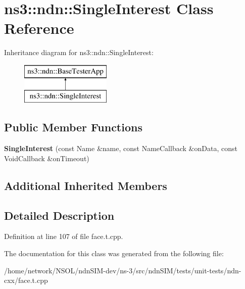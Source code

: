 \hypertarget{classns3_1_1ndn_1_1SingleInterest}{}\section{ns3\+:\+:ndn\+:\+:Single\+Interest Class Reference}
\label{classns3_1_1ndn_1_1SingleInterest}
Inheritance diagram for ns3\+:\+:ndn\+:\+:Single\+Interest\+:\begin{figure}[H]
\begin{center}
\leavevmode
\includegraphics[height=2.000000cm]{classns3_1_1ndn_1_1SingleInterest}
\end{center}
\end{figure}
\subsection*{Public Member Functions}
\begin{DoxyCompactItemize}
\item 
{\bfseries Single\+Interest} (const Name \&name, const Name\+Callback \&on\+Data, const Void\+Callback \&on\+Timeout)\hypertarget{classns3_1_1ndn_1_1SingleInterest_a289e612447e3979128070667e7056704}{}\label{classns3_1_1ndn_1_1SingleInterest_a289e612447e3979128070667e7056704}

\end{DoxyCompactItemize}
\subsection*{Additional Inherited Members}


\subsection{Detailed Description}


Definition at line 107 of file face.\+t.\+cpp.



The documentation for this class was generated from the following file\+:\begin{DoxyCompactItemize}
\item 
/home/network/\+N\+S\+O\+L/ndn\+S\+I\+M-\/dev/ns-\/3/src/ndn\+S\+I\+M/tests/unit-\/tests/ndn-\/cxx/face.\+t.\+cpp\end{DoxyCompactItemize}
